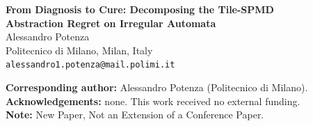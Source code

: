 \documentclass[11pt]{article}
\begin{document}
\begin{center}
{\LARGE\bfseries From Diagnosis to Cure: Decomposing the Tile-SPMD\\[2pt] Abstraction Regret on Irregular Automata}\\[2em]
{\large Alessandro Potenza}\\[0.5em]
Politecnico di Milano, Milan, Italy\\[0.5em]
\texttt{alessandro1.potenza@mail.polimi.it}\\[2em]
\end{center}
\noindent\textbf{Corresponding author:} Alessandro Potenza (Politecnico di Milano).\\[1em]
\noindent\textbf{Acknowledgements:} none. This work received no external funding.\\[1em]
\noindent\textbf{Note:} New Paper, Not an Extension of a Conference Paper.
\end{document}
